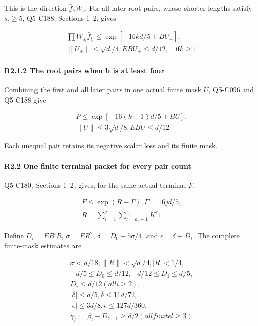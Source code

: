 This is the direction \(\bar f_3W_c\). For all later root pairs, whose shorter lengths satisfy \(s_i\ge5\), Q5-C188, Sections 1--2, gives

\[
\begin{gathered}
\prod W_{s_i}\bar f_{t_i}\le \exp[-16kd/5+B U_+],\\
\|U_+\|\le \sqrt{d}/4,EBU_+\le d/12,\quad\text{if} k\ge 1 
\end{gathered}\tag{R2.1.5}
\]

\paragraph{R2.1.2 The root pairs when b is at least four}

Combining the first and all later pairs in one actual finite mask \(U\), Q5-C096 and Q5-C188 give

\[
\begin{gathered}
P\le \exp[-16(k+1)d/5+B U],\\
\|U\|\le 3\sqrt{d}/8,EBU\le d/12 
\end{gathered}\tag{R2.1.6}
\]

Each unequal pair retains its negative scalar loss and its finite mask.

\paragraph{R2.2 One finite terminal packet for every pair count}

Q5-C180, Sections 1--2, gives, for the same actual terminal \(F\),

\[
\begin{gathered}
F\le \exp(R-\Gamma),\Gamma=16jd/5,\\
R=\sum_{i=1}^{j} \sum_{r=a_i+1}^{z_i} K^r1
\end{gathered}
\]

Define \(D_i=EB^iR\), \(\sigma=ER^2\), \(\delta=D_0+5\sigma/4\), and \(\epsilon=\delta+D_1\). The complete finite-mask estimates are

\[
\begin{gathered}
\sigma<d/18,\|R\|<\sqrt{d}/4,|R|<1/4,\\
-d/5\le D_0\le d/12,-d/12\le D_1\le d/5,\\
D_i\le d/12 (all i\ge 2),\\
|\delta|\le d/5,\delta\le 11d/72,\\
|\epsilon|\le 3d/8,\epsilon\le 127d/360,\\
\gamma_l:=\beta_l-D_{l-1}\ge d/2 (allfinite l\ge 3) 
\end{gathered}\tag{R2.2.1}
\]

